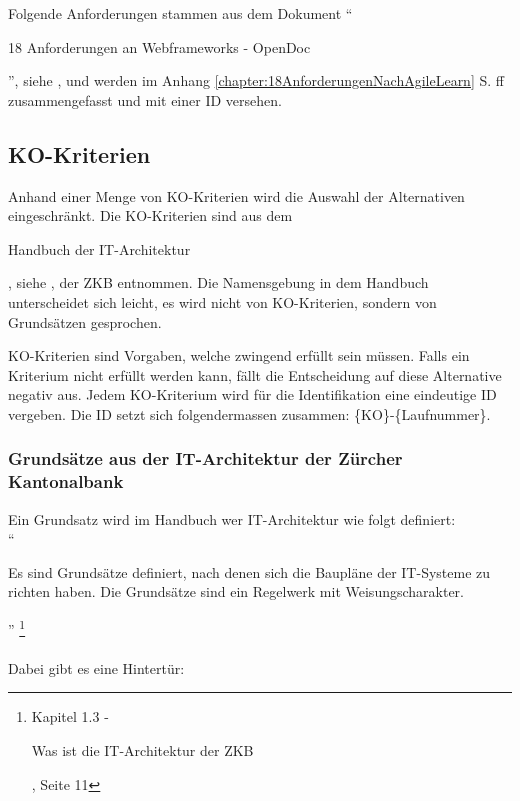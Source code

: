   Folgende Anforderungen stammen aus dem Dokument ``\begin{itshape}18
  Anforderungen an Webframeworks -
  OpenDoc\end{itshape}'', siehe \cite{AnforderungenAnWebframeworks}, und werden
  im Anhang \ref{chapter:18AnforderungenNachAgileLearn}
   S.
  \pageref{chapter:18AnforderungenNachAgileLearn}ff zusammengefasst und mit
  einer ID versehen.

  \subsection{KO-Kriterien}
  
  Anhand einer Menge von KO-Kriterien wird die Auswahl der Alternativen
  eingeschränkt. Die KO-Kriterien sind aus dem \begin{itshape}Handbuch der
  IT-Architektur\end{itshape}, siehe \cite{ZkbHandbuchDerItArchitektur}, der
  \ac{ZKB} entnommen. Die Namensgebung in dem Handbuch unterscheidet sich
  leicht, es wird nicht von KO-Kriterien, sondern von Grundsätzen gesprochen.
  
  KO-Kriterien sind Vorgaben, welche zwingend erfüllt sein müssen. Falls ein
  Kriterium nicht erfüllt werden kann, fällt die Entscheidung auf diese
  Alternative negativ aus. Jedem KO-Kriterium wird für die Identifikation eine
  eindeutige ID vergeben. Die ID setzt sich folgendermassen zusammen: 
  \{KO\}-\{Laufnummer\}.

  \subsubsection{Grundsätze aus der IT-Architektur der Zürcher Kantonalbank}
  
  Ein Grundsatz wird im Handbuch wer IT-Architektur wie folgt definiert:\\
  
  ``\begin{itshape}Es sind Grundsätze definiert, nach denen sich die Baupläne
  der IT-Systeme zu richten haben. Die Grundsätze sind ein Regelwerk mit
  Weisungscharakter.\end{itshape}''
  \footnote{\cite{ZkbHandbuchDerItArchitektur} Kapitel 1.3 - \begin{itshape}Was
  ist die IT-Architektur der ZKB\end{itshape}, Seite 11}
  \\
  \\
  \noindent
  Dabei gibt es eine Hintertür:\\

